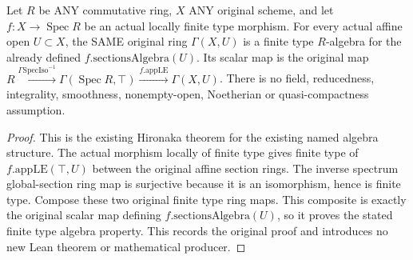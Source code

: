 \begin{lemma}
\label{scheme:existing-hironaka-original-section-finite-type}
\leanok
{}
Let $R$ be ANY commutative ring, $X$ ANY original scheme, and let
$f:X\to\operatorname{Spec}R$ be an actual locally finite type morphism.
For every actual affine open $U\subset X$, the SAME original ring
$\Gamma(X,U)$ is a finite type $R$-algebra for the already defined
$f.\mathrm{sectionsAlgebra}(U)$. Its scalar map is the original map
$R\xrightarrow{\Gamma\mathrm{SpecIso}^{-1}}
\Gamma(\operatorname{Spec}R,\top)\xrightarrow{f.\mathrm{appLE}}\Gamma(X,U)$.
There is no field, reducedness, integrality, smoothness, nonempty-open,
Noetherian or quasi-compactness assumption.
\end{lemma}
\begin{proof}
This is the existing Hironaka theorem for the existing named algebra
structure. The actual morphism locally of finite type gives finite type
of $f.\mathrm{appLE}(\top,U)$ between the original affine section rings.
The inverse spectrum global-section ring map is surjective because it
is an isomorphism, hence is finite type. Compose these two original
finite type ring maps. This composite is exactly the original scalar
map defining $f.\mathrm{sectionsAlgebra}(U)$, so it proves the stated
finite type algebra property. This records the original proof and
introduces no new Lean theorem or mathematical producer.
\end{proof}
